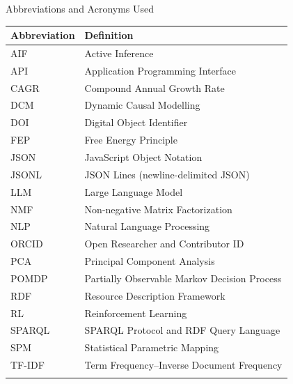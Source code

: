 \documentclass[
  ignorenonframetext,
]{beamer}
\newcounter{none} %
\begin{document}
\begin{frame}{Abbreviations and Acronyms Used}
\protect{}\label{abbreviations-and-acronyms-used}
{\def\LTcaptype{none} %
\begin{longtable}[]{@{}ll@{}}
\toprule\noalign{}
Abbreviation & Definition \\
\midrule\noalign{}
\endhead
AIF & Active Inference \\
API & Application Programming Interface \\
CAGR & Compound Annual Growth Rate \\
DCM & Dynamic Causal Modelling \\
DOI & Digital Object Identifier \\
FEP & Free Energy Principle \\
JSON & JavaScript Object Notation \\
JSONL & JSON Lines (newline-delimited JSON) \\
LLM & Large Language Model \\
NMF & Non-negative Matrix Factorization \\
NLP & Natural Language Processing \\
ORCID & Open Researcher and Contributor ID \\
PCA & Principal Component Analysis \\
POMDP & Partially Observable Markov Decision Process \\
RDF & Resource Description Framework \\
RL & Reinforcement Learning \\
SPARQL & SPARQL Protocol and RDF Query Language \\
SPM & Statistical Parametric Mapping \\
TF-IDF & Term Frequency--Inverse Document Frequency \\
\bottomrule\noalign{}
\end{longtable}
}
\end{frame}
\end{document}
